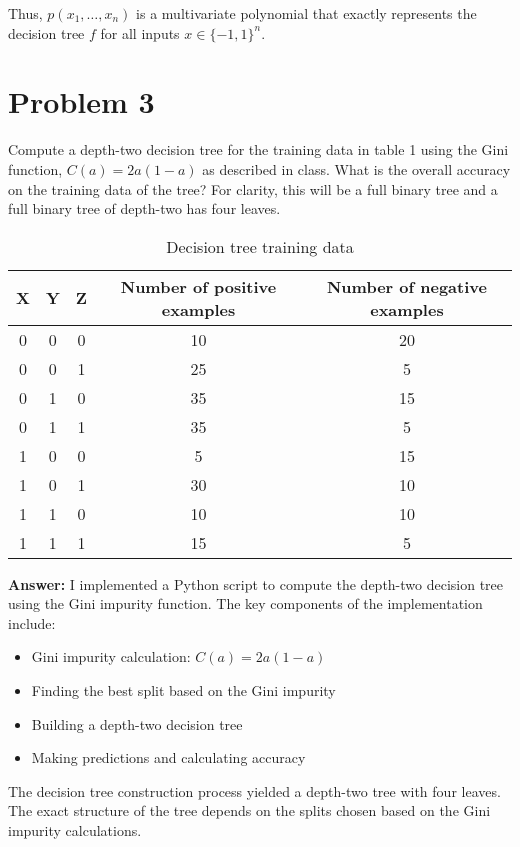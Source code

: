 \documentclass{article}
\begin{document}
Thus, $p(x_1,\ldots,x_n)$ is a multivariate polynomial that exactly represents the decision tree $f$ for all inputs $x \in \{-1,1\}^n$.

\section*{Problem 3}

\noindent [10 points] Compute a depth-two decision tree for the training data in table 1 using the Gini function, $C(a) = 2a(1-a)$ as described in class. What is the overall accuracy on the training data of the tree? For clarity, this will be a full binary tree and a full binary tree of depth-two has four leaves.

\begin{table}[h]
\centering
\begin{tabular}{|c|c|c|c|c|}
\hline
X & Y & Z & Number of positive examples & Number of negative examples \\
\hline
0 & 0 & 0 & 10 & 20 \\
0 & 0 & 1 & 25 & 5 \\
0 & 1 & 0 & 35 & 15 \\
0 & 1 & 1 & 35 & 5 \\
1 & 0 & 0 & 5 & 15 \\
1 & 0 & 1 & 30 & 10 \\
1 & 1 & 0 & 10 & 10 \\
1 & 1 & 1 & 15 & 5 \\
\hline
\end{tabular}
\caption{Decision tree training data}
\label{tab:decision_tree_data}
\end{table}

\textbf{Answer:}
I implemented a Python script to compute the depth-two decision tree using the Gini impurity function. The key components of the implementation include:

\begin{itemize}
    \item Gini impurity calculation: $C(a) = 2a(1-a)$
    \item Finding the best split based on the Gini impurity
    \item Building a depth-two decision tree
    \item Making predictions and calculating accuracy
\end{itemize}

The decision tree construction process yielded a depth-two tree with four leaves. The exact structure of the tree depends on the splits chosen based on the Gini impurity calculations.
\end{document}
